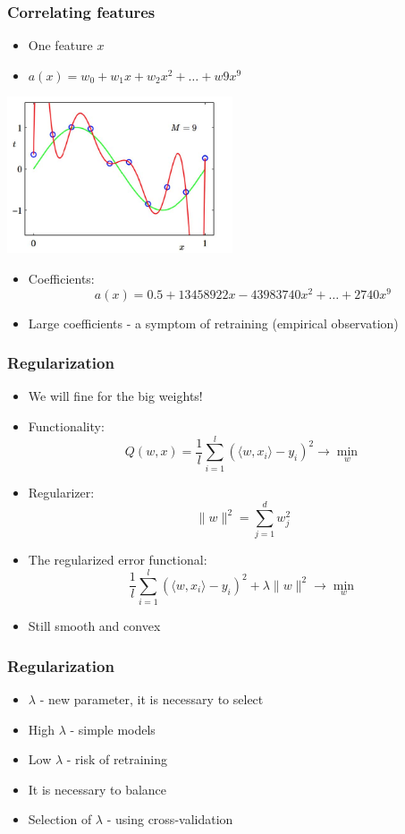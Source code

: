 \documentclass[default]{beamer}
\begin{document}
	\begin{frame}	
		\frametitle{Correlating features}
		
		\begin{itemize}
			\item One feature $x$
			\item $a(x)=w_0+w_1x+w_2x^2+\dots+w9x^9$
		\end{itemize}
		
		\centering
		\includegraphics[width=0.5\textwidth]{linear_37.jpg}
		\begin{itemize}
			\item Coefficients:
			\[
				a(x)=0.5+13458922 x - 43983740 x^2 + \dots+ 2740 x^9
			\]
			\item Large coefficients - a symptom of retraining (empirical observation)
		\end{itemize}
	\end{frame}


	\begin{frame}	
		\frametitle{Regularization}
		
		\begin{itemize}
			\item We will fine for the big weights!
			\item Functionality:
			\[
				Q(w,x)=\frac{1}{l}\sum_{i=1}^l (\langle w,x_i\rangle-y_i)^2\rightarrow\min_w
			\]
			\item Regularizer:
			\[
				\|w\|^2=\sum_{j=1}^d w_j^2
			\]
			\item The regularized error functional:
			\[
				\frac{1}{l}\sum_{i=1}^l (\langle w,x_i\rangle-y_i)^2+\lambda \|w\|^2\rightarrow\min_w
			\]
			\item Still smooth and convex
		\end{itemize}
	\end{frame}


	\begin{frame}	
		\frametitle{Regularization}
		\Large
		\begin{itemize}
			\item $\lambda$ - new parameter, it is necessary to select
			\item High $\lambda$  - simple models
			\item Low $\lambda$ - risk of retraining
			\item It is necessary to balance
			\item Selection of $\lambda$ - using cross-validation
		\end{itemize}
	\end{frame}
\end{document}

